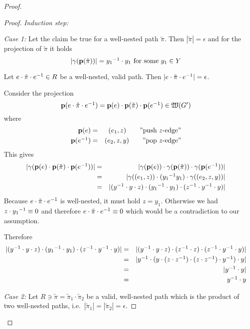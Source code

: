 \begin{proof}
\begin{proof}
\medski
{\em Induction step:}

{\em Case 1:} Let the claim be true for a well-nested path $\tilde{\pi}$. Then
$|\tilde{\pi}| = \epsilon$ and for the projection of $\tilde{\pi}$ it holds
\[ |\gamma(\mathbf{p}({\tilde{\pi}}))| = \mbox{${y_1}^{-1}$} \cdot y_1\text{ for some }y_1 \in Y
\]

Let $e \cdot \tilde{\pi} \cdot \mbox{${e}^{-1}$} \in R$ be a well-nested, valid path. Then
$|e \cdot \tilde{\pi} \cdot \mbox{${e}^{-1}$}| = \epsilon$.

Consider the projection
\[ \mathbf{p}({e \cdot \tilde{\pi} \cdot \mbox{${e}^{-1}$}}) = \mathbf{p}({e}) \cdot \mathbf{p}({\tilde{\pi}})
\cdot \mathbf{p}({\mbox{${e}^{-1}$}}) \in \mbox{$\mathfrak{W}({G'})$} \]
where
\begin{eqnarray*}
\mathbf{p}({e}) &=& (e_1, z) \qquad\text{''push $z$-edge''}\\
\mathbf{p}({\mbox{${e}^{-1}$}}) &=& (e_2, z, y) \qquad\text{''pop $z$-edge''}\\
\end{eqnarray*}
This gives
\begin{eqnarray*}
|\gamma(\mathbf{p}({e}) \cdot \mathbf{p}({\tilde{\pi}}) \cdot \mathbf{p}({\mbox{${e}^{-1}$}}))|&=&
|\gamma(\mathbf{p}({e})) \cdot \gamma(\mathbf{p}({\tilde{\pi}})) \cdot \gamma(\mathbf{p}({\mbox{${e}^{-1}$}}))|
\\
&=&|\gamma((e_1, z)) \cdot  (\mbox{${y_1}^{-1}$} y_1) \cdot \gamma((e_2, z, y))| \\
&=& |(\mbox{${y}^{-1}$} \cdot y \cdot z) \cdot (\mbox{${y_1}^{-1}$} \cdot y_1) \cdot (\mbox{${z}^{-1}$} \cdot
\mbox{${y}^{-1}$} \cdot y)| \\
\end{eqnarray*}
Because $e \cdot \tilde{\pi} \cdot \mbox{${e}^{-1}$}$ is well-nested, it must hold
$z = y_1$. Otherwise we had $z \cdot \mbox{${y_1}^{-1}$} \equiv 0$ and therefore $e \cdot
\tilde{\pi} \cdot \mbox{${e}^{-1}$} \equiv 0$ which would be a contradiction to our
assumption.

Therefore
\begin{eqnarray*}
|(\mbox{${y}^{-1}$} \cdot y \cdot z) \cdot (\mbox{${y_1}^{-1}$} \cdot y_1) \cdot (\mbox{${z}^{-1}$} \cdot
\mbox{${y}^{-1}$} \cdot y)| &=&
|(\mbox{${y}^{-1}$} \cdot y \cdot z) \cdot (\mbox{${z}^{-1}$} \cdot z) \cdot (\mbox{${z}^{-1}$} \cdot
\mbox{${y}^{-1}$} \cdot y)| \\
&=& |\mbox{${y}^{-1}$} \cdot (y \cdot (z \cdot \mbox{${z}^{-1}$}) \cdot (z \cdot \mbox{${z}^{-1}$}) \cdot
\mbox{${y}^{-1}$}) \cdot y| \\
&=& |\mbox{${y}^{-1}$} \cdot y| \\
&=& \mbox{${y}^{-1}$}  \cdot y
\end{eqnarray*}

\medskip
{\em Case 2:} Let $R \ni \tilde{\pi} = \tilde{\pi}_1 \cdot \tilde{\pi}_2$ be a
valid, well-nested path which is the product of two well-nested paths, i.e.\
$|\tilde{\pi}_1| = |\tilde{\pi}_2| = \epsilon$.


\end{proof}
\end{proof}
